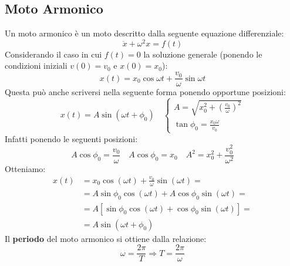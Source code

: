 \documentclass{report}
\newcommand{\then}{\ensuremath{\Rightarrow}}
\begin{document}
\subsection{Moto Armonico}
Un moto armonico è un moto descritto dalla seguente equazione differenziale:
\begin{equation}
    \boxed{\ddot{x}+\omega^2x=f(t)}
\end{equation}
Considerando il caso in cui $f(t)=0$ la soluzione generale (ponendo le condizioni iniziali $v(0)=v_0$ e $x(0)=x_0$):
\begin{equation}
    x(t)=x_0\cos{\omega t}+\frac{v_0}{\omega}\sin{\omega t}
\end{equation}
Questa può anche scriversi nella seguente forma ponendo opportune posizioni:
\begin{equation}
    x(t)=A\sin\left(\omega t+\phi_0\right)\quad\begin{cases}
    A=\sqrt{x_0^2+\left(\frac{v_0}{\omega}\right)^2}\\
    \tan\phi_0=\frac{x_0\omega}{v_0}
    \end{cases}
\end{equation}
Infatti ponendo le seguenti posizioni:
\[A\cos\phi_0=\frac{v_0}{\omega}\quad A\cos\phi_0=x_0\quad A^2=x_0^2+\frac{v_0^2}{\omega^2}\]
Otteniamo:
\begin{equation}
\begin{split}
    x(t)&=x_0\cos(\omega t)+\frac{v_0}{\omega}\sin(\omega t)=\\
    &=A\sin\phi_0\cos(\omega t)+A\cos\phi_0\sin(\omega t)=\\
    &=A\left[\sin\phi_0\cos(\omega t)+\cos\phi_0\sin(\omega t)\right]=\\
    &=A\sin(\omega t+\phi_0)
\end{split}
\end{equation}
Il \textbf{periodo} del moto armonico si ottiene dalla relazione:
\[\omega=\frac{2\pi}{T}\then\boxed{T=\frac{2\pi}{\omega}}\]
\end{document}
